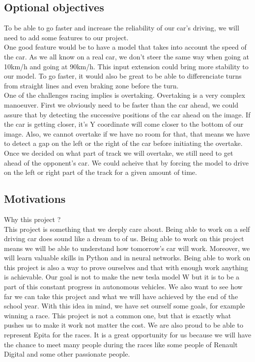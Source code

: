 \documentclass[12pt]{article}
\begin{document}
\subsection{Optional objectives}
To be able to go faster and increase the reliability of our car's driving, we will need to add some features to our project. \\

One good feature would be to have a model that takes into account the speed of the car. As we all know on a real car, we don't steer the same way when going at 10km/h and going at 90km/h. This input extension could bring more stability to our model.
To go faster, it would also be great to be able to differenciate turns from straight lines and even braking zone before the turn. \\

One of the challenges racing implies is overtaking. Overtaking is a very complex manoeuver. First we obviously need to be faster than the car ahead, we could assure that by detecting the successive positions of the car ahead on the image. If the car is getting closer, it's Y coordinate will come closer to the bottom of our image. Also, we cannot overtake if we have no room for that, that means we have to detect a gap on the left or the right of the car before initiating the overtake. Once we decided on what part of track we will overtake, we still need to get ahead of the opponent's car. We could acheive that by forcing the model to drive on the left or right part of the track for a given amount of time.

\subsection{Motivations}
Why this project ? \\
This project is something that we deeply care about. Being able to work on a self driving car does sound like a dream to of us. Being able to work on this project means we will be able to understand how tomorrow's car will work. Moreover, we will learn valuable skills in Python and in neural networks. 
Being able to work on this project is also a way to prove ourselves and that with enough work anything is achievable.
Our goal is not to make the new tesla model W but it is to be a part of this constant progress in autonomous vehicles. We also want to see how far we can take this project and what we will have achieved by the end of the school year. With this idea in mind, we have set ourself some goals, for example winning a race. This project is not a common one, but that is exactly what pushes us to make it work not matter the cost. We are also proud to be able to represent Epita for the races. 
It is a great opportunity for us because we will have the chance to meet many people during the races like some people of Renault Digital and some other passionate people.
\end{document}

